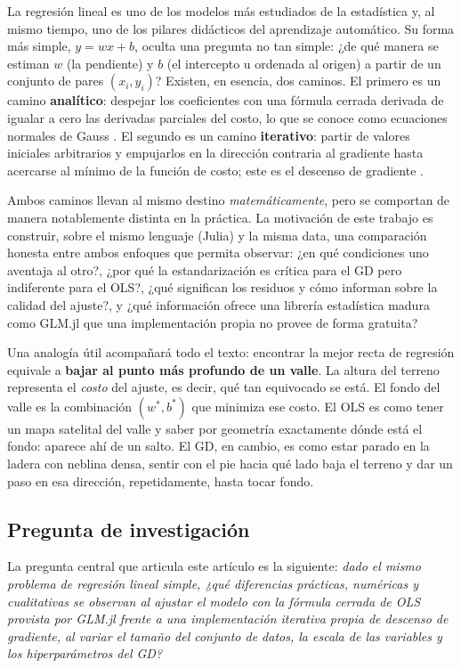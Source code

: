 \documentclass[11pt,a4paper]{article}
\begin{document}
La regresión lineal es uno de los modelos más estudiados de la estadística y, al mismo tiempo, uno de los pilares didácticos del aprendizaje automático. Su forma más simple, $y = wx + b$, oculta una pregunta no tan simple: ¿de qué manera se estiman $w$ (la pendiente) y $b$ (el intercepto u ordenada al origen) a partir de un conjunto de pares $(x_i, y_i)$? Existen, en esencia, dos caminos. El primero es un camino \textbf{analítico}: despejar los coeficientes con una fórmula cerrada derivada de igualar a cero las derivadas parciales del costo, lo que se conoce como ecuaciones normales de Gauss \cite{wiki_mco,cds_mco}. El segundo es un camino \textbf{iterativo}: partir de valores iniciales arbitrarios y empujarlos en la dirección contraria al gradiente hasta acercarse al mínimo de la función de costo; este es el descenso de gradiente \cite{codificando_lineal,ibm_gd,keepcoding_gd}.

Ambos caminos llevan al mismo destino \textit{matemáticamente}, pero se comportan de manera notablemente distinta en la práctica. La motivación de este trabajo es construir, sobre el mismo lenguaje (Julia) y la misma data, una comparación honesta entre ambos enfoques que permita observar: ¿en qué condiciones uno aventaja al otro?, ¿por qué la estandarización es crítica para el GD pero indiferente para el OLS?, ¿qué significan los residuos y cómo informan sobre la calidad del ajuste?, y ¿qué información ofrece una librería estadística madura como GLM.jl que una implementación propia no provee de forma gratuita?

Una analogía útil acompañará todo el texto: encontrar la mejor recta de regresión equivale a \textbf{bajar al punto más profundo de un valle}. La altura del terreno representa el \textit{costo} del ajuste, es decir, qué tan equivocado se está. El fondo del valle es la combinación $(w^*, b^*)$ que minimiza ese costo. El OLS es como tener un mapa satelital del valle y saber por geometría exactamente dónde está el fondo: aparece ahí de un salto. El GD, en cambio, es como estar parado en la ladera con neblina densa, sentir con el pie hacia qué lado baja el terreno y dar un paso en esa dirección, repetidamente, hasta tocar fondo.

\subsection{Pregunta de investigación}

La pregunta central que articula este artículo es la siguiente: \textit{dado el mismo problema de regresión lineal simple, ¿qué diferencias prácticas, numéricas y cualitativas se observan al ajustar el modelo con la fórmula cerrada de OLS provista por GLM.jl frente a una implementación iterativa propia de descenso de gradiente, al variar el tamaño del conjunto de datos, la escala de las variables y los hiperparámetros del GD?}
\end{document}
